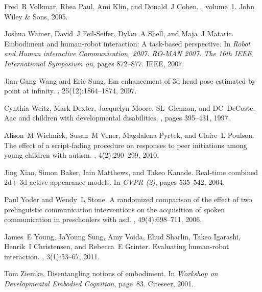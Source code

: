 \documentclass{ut-thesis}
\begin{document}
\begin{thebibliography}{100}
Fred~R Volkmar, Rhea Paul, Ami Klin, and Donald~J Cohen.
, volume~1.
\newblock John Wiley \& Sons, 2005.

Joshua Wainer, David~J Feil-Seifer, Dylan~A Shell, and Maja~J Mataric.
\newblock Embodiment and human-robot interaction: A task-based perspective.
\newblock In {\em Robot and Human interactive Communication, 2007. RO-MAN 2007.
  The 16th IEEE International Symposium on}, pages 872--877. IEEE, 2007.

Jian-Gang Wang and Eric Sung.
\newblock Em enhancement of 3d head pose estimated by point at infinity.
, 25(12):1864--1874, 2007.

Cynthia Weitz, Mark Dexter, Jacquelyn Moore, SL~Glennon, and DC~DeCoste.
\newblock Aac and children with developmental disabilities.
, pages
  395--431, 1997.

Alison~M Wichnick, Susan~M Vener, Magdalena Pyrtek, and Claire~L Poulson.
\newblock The effect of a script-fading procedure on responses to peer
  initiations among young children with autism.
, 4(2):290--299, 2010.

Jing Xiao, Simon Baker, Iain Matthews, and Takeo Kanade.
\newblock Real-time combined 2d+ 3d active appearance models.
\newblock In {\em CVPR (2)}, pages 535--542, 2004.

Paul Yoder and Wendy~L Stone.
\newblock A randomized comparison of the effect of two prelinguistic
  communication interventions on the acquisition of spoken communication in
  preschoolers with asd.
,
  49(4):698--711, 2006.

James~E Young, JaYoung Sung, Amy Voida, Ehud Sharlin, Takeo Igarashi, Henrik~I
  Christensen, and Rebecca~E Grinter.
\newblock Evaluating human-robot interaction.
, 3(1):53--67, 2011.

Tom Ziemke.
\newblock Disentangling notions of embodiment.
\newblock In {\em Workshop on Developmental Embodied Cognition}, page~83.
  Citeseer, 2001.

\end{thebibliography}


\end{document}
